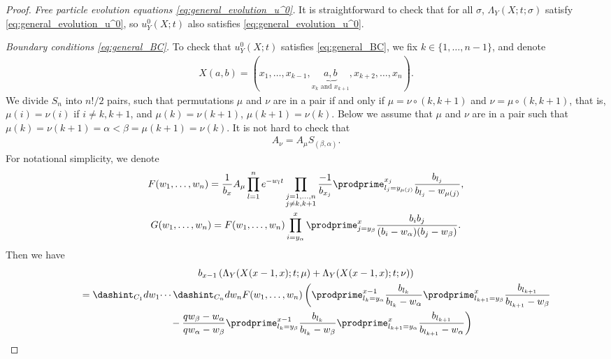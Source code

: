 \begin{proof}
\textit{Free particle evolution equations \eqref{eq:general_evolution_u^0}.}
 It is straightforward to check that for all $\sigma$, $\Lambda_Y(X; t; \sigma)$ satisfy \eqref{eq:general_evolution_u^0}, so $u^0_Y(X; t)$ also satisf\/ies \eqref{eq:general_evolution_u^0}.

\textit{Boundary conditions \eqref{eq:general_BC}.}
 To check that $u^0_Y(X; t)$ satisf\/ies \eqref{eq:general_BC}, we f\/ix $k \in \{ 1, \dotsc, n - 1 \}$, and denote
 \begin{gather*}
 X(a, b) = (x_1, \dotsc, x_{k - 1}, \!\!\underbrace{a, b}_{x_k \text{ and } x_{k + 1}}\!\! , x_{k + 2}, \dotsc, x_n).
 \end{gather*}
 We divide $S_n$ into $n!/2$ pairs, such that permutations $\mu$ and $\nu$ are in a pair if and only if $\mu = \nu \circ (k, k + 1)$ and $\nu = \mu \circ (k, k + 1)$, that is, $\mu(i) = \nu(i)$ if $i \neq k, k + 1$, and $\mu(k) = \nu(k + 1)$, $\mu(k + 1) = \nu(k)$. Below we assume that $\mu$ and $\nu$ are in a pair such that $\mu(k) = \nu(k + 1) = \alpha < \beta = \mu(k + 1) = \nu(k)$. It is not hard to check that
 \begin{gather*}
 A_{\nu} = A_{\mu} S_{(\beta, \alpha)}.
 \end{gather*}
 For notational simplicity, we denote
 \begin{gather*}
 F(w_1, \dotsc, w_n) =  \frac{1}{b_x} A_{\mu} \prod^n_{l = 1} e^{-w_l t} \prod_{\substack{j = 1, \dotsc, n \\ j \neq k, k + 1}} \frac{-1}{b_{x_j}} \prodprime^{x_j}_{l_j = y_{\mu(j)}} \frac{b_{l_j}}{b_{l_j} - w_{\mu(j)}}, \\
 G(w_1, \dotsc, w_n) =  F(w_1, \dotsc, w_n) \prod^x_{i = y_{\alpha}} \prodprime^x_{j = y_{\beta}} \frac{b_i b_j}{(b_i - w_{\alpha})(b_j - w_{\beta})}.
 \end{gather*}
 Then we have
 \begin{gather}
   b_{x - 1} \left( \Lambda_Y(X(x - 1, x); t; \mu) + \Lambda_Y(X(x - 1, x); t; \nu) \right)\nonumber \\
   \qquad{}
 =   \dashint_{C_1} dw_1 \dotsi \dashint_{C_n} dw_n F(w_1, \dotsc, w_n) \left( \prodprime^{x - 1}_{l_k = y_{\alpha}} \frac{b_{l_k}}{b_{l_k} - w_{\alpha}} \prodprime^x_{l_{k + 1} = y_{\beta}} \frac{b_{l_{k + 1}}}{b_{l_{k + 1}} - w_{\beta}} \right. \nonumber\\
\left. \qquad\quad{} - \frac{qw_{\beta} - w_{\alpha}}{qw_{\alpha} - w_{\beta}} \prodprime^{x - 1}_{l_k = y_{\beta}} \frac{b_{l_k}}{b_{l_k} - w_{\beta}} \prodprime^x_{l_{k + 1} = y_{\alpha}} \frac{b_{l_{k + 1}}}{b_{l_{k + 1}} - w_{\alpha}} \right) \nonumber\\

\end{gather}
\end{proof}
